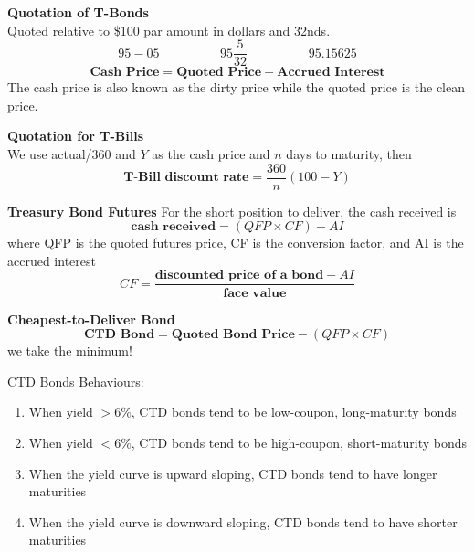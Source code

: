 \documentclass[11pt,fleqn]{book} %
\numberwithin{equation}{section} %
\numberwithin{figure}{section} %
\numberwithin{table}{section} %
\begin{document}
\begin{definition}\textbf{Quotation of T-Bonds}\\
Quoted relative to \$100 par amount in dollars and 32nds. 
$$
95-05\hspace{2cm}95\frac{5}{32}\hspace{2cm}95.15625
$$
$$
\textbf{Cash Price}=\textbf{Quoted Price}+\textbf{Accrued Interest}
$$
The cash price is also known as the dirty price while the quoted price is the clean price.
\end{definition} 
 
 \begin{definition}\textbf{Quotation for T-Bills}\\
 We use actual/360 and $Y$ as the cash price and $n$ days to maturity, then
 $$
 \textbf{T-Bill discount rate}=\frac{360}{n}(100-Y)
 $$
 \end{definition}
\begin{definition}\textbf{Treasury Bond Futures}
For the short position to deliver, the cash received is
$$
\textbf{cash received}=(QFP\times CF)+AI
$$
where QFP is the quoted futures price, CF is the conversion factor, and AI is the accrued interest
$$
CF=\frac{\textbf{discounted price of a bond}-AI}{\textbf{face value}}
$$
\end{definition}
 \begin{theorem}\textbf{Cheapest-to-Deliver Bond}\\
 $$
 \textbf{CTD Bond}=\textbf{Quoted Bond Price}-(QFP\times CF)
 $$
 we take the minimum!
 \end{theorem}
 \begin{remark}CTD Bonds Behaviours:
 \begin{enumerate}
     \item When yield $>6\%$, CTD bonds tend to be low-coupon, long-maturity bonds
     \item When yield $<6\%$, CTD bonds tend to be high-coupon, short-maturity bonds
     \item When the yield curve is upward sloping, CTD bonds tend to have longer maturities
     \item When the yield curve is downward sloping, CTD bonds tend to have shorter maturities
 \end{enumerate}
 \end{remark}
\end{document}
